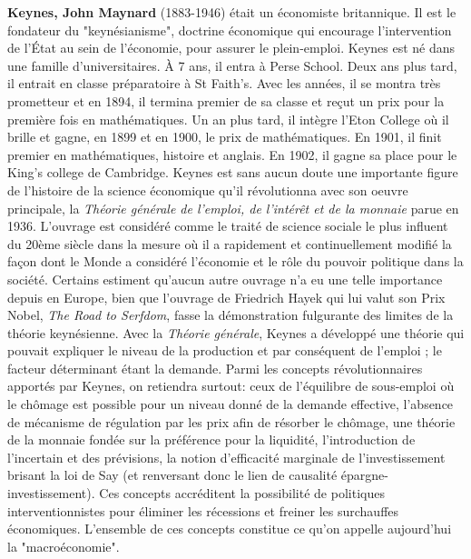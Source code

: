 \textbf{Keynes, John Maynard} (1883-1946) était un économiste britannique. Il est le fondateur du "keynésianisme", doctrine économique qui encourage l'intervention de l'État au sein de l'économie, pour assurer le plein-emploi. Keynes est né dans une famille d'universitaires. À 7 ans, il entra à Perse School. Deux ans plus tard, il entrait en classe préparatoire à St Faith's. Avec les années, il se montra très prometteur et en 1894, il termina premier de sa classe et reçut un prix pour la première fois en mathématiques. Un an plus tard, il intègre l'Eton College où il brille et gagne, en 1899 et en 1900, le prix de mathématiques. En 1901, il finit premier en mathématiques, histoire et anglais. En 1902, il gagne sa place pour le King's college de Cambridge. Keynes est sans aucun doute une importante figure de l'histoire de la science économique qu'il révolutionna avec son oeuvre principale, la \textit{Théorie générale de l'emploi, de l'intérêt et de la monnaie} parue en 1936. L'ouvrage est considéré comme le traité de science sociale le plus influent du 20ème siècle dans la mesure où il a rapidement et continuellement modifié la façon dont le Monde a considéré l'économie et le rôle du pouvoir politique dans la société. Certains estiment qu'aucun autre ouvrage n'a eu une telle importance depuis en Europe, bien que l'ouvrage de Friedrich Hayek qui lui valut son Prix Nobel, \textit{The Road to Serfdom}, fasse la démonstration fulgurante des limites de la théorie keynésienne. Avec la \textit{Théorie générale}, Keynes a développé une théorie qui pouvait expliquer le niveau de la production et par conséquent de l'emploi ; le facteur déterminant étant la demande. Parmi les concepts révolutionnaires apportés par Keynes, on retiendra surtout: ceux de l'équilibre de sous-emploi où le chômage est possible pour un niveau donné de la demande effective, l'absence de mécanisme de régulation par les prix afin de résorber le chômage, une théorie de la monnaie fondée sur la préférence pour la liquidité, l'introduction de l'incertain et des prévisions, la notion d'efficacité marginale de l'investissement brisant la loi de Say (et renversant donc le lien de causalité épargne-investissement). Ces concepts accréditent la possibilité de politiques interventionnistes pour éliminer les récessions et freiner les surchauffes économiques. L'ensemble de ces concepts constitue ce qu'on appelle aujourd'hui la "macroéconomie".

